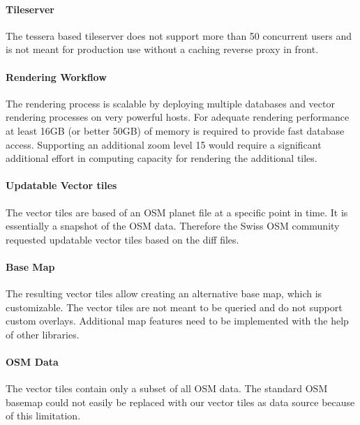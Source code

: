 \paragraph{Tileserver} The tessera based tileserver does not support more than 50 concurrent users and is not meant for production use without a caching reverse proxy in front.

\paragraph{Rendering Workflow} The rendering process is scalable by deploying multiple databases and vector rendering processes on very powerful hosts. For adequate rendering performance at least 16GB (or better 50GB) of memory is required to provide fast database access.
Supporting an additional zoom level 15 would require a significant additional effort in computing capacity for rendering the additional tiles.

\paragraph{Updatable Vector tiles} The vector tiles are based of an OSM planet file at a specific point in time. It is essentially a snapshot of the OSM data. Therefore the Swiss OSM community requested updatable vector tiles based on the diff files.

\paragraph{Base Map} The resulting vector tiles allow creating an alternative base map, which is customizable. The vector tiles are not meant to be queried and do not support custom overlays. Additional map features need to be implemented with the help of other libraries.

\paragraph{OSM Data} The vector tiles contain only a subset of all OSM data. The standard OSM basemap could not easily be replaced with our vector tiles as data source because of this limitation.